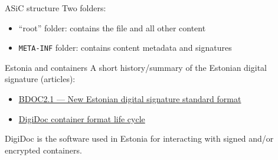 \begin{frame}{ASiC structure}
  Two folders:
  \begin{itemize}[<+(1)->]
    \item \enquote{root} folder: contains the file and all other content
    \item \texttt{META-INF} folder: contains content metadata and signatures
  \end{itemize}
\end{frame}

\begin{frame}{Estonia and containers}
  A short history/summary of the Estonian digital signature (articles):
  \begin{itemize}
    \item \href{https://www.id.ee/en/article/bdoc2-1-new-estonian-digital-signature-standard-format/}{BDOC2.1 --- New Estonian digital signature standard format}
    \item \href{https://www.id.ee/en/article/digidoc-container-format-life-cycle-2/}{DigiDoc container format life cycle}
  \end{itemize}

  \vspace*{1em}

  \pause
  DigiDoc is the software used in Estonia for interacting with signed and/or encrypted containers.
\end{frame}


